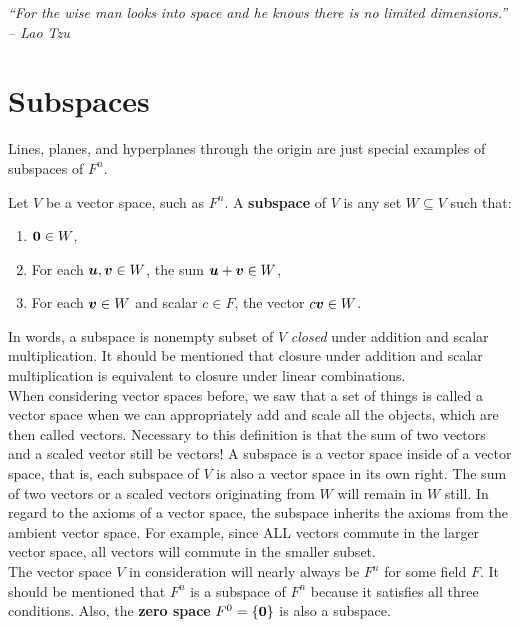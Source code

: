 \begin{center} 
\emph{``For the wise man looks into space and he knows there is no limited dimensions.'' -- Lao Tzu}
\end{center}

\section{Subspaces}\label{sec:subspace}
Lines, planes, and hyperplanes through the origin are just special examples of subspaces of $F^n$.\\

\begin{Def} Let $V$ be a vector space, such as $F^n$. A \textbf{subspace} of $V$ is any set $W \subseteq V$ such that:
\begin{enumerate}[!THM!, start=1]
\item $\boldsymbol 0 \in W$,
\item For each $\boldsymbol u, \boldsymbol v \in W$, the sum $\boldsymbol u + \boldsymbol v \in W$,
\item For each $\boldsymbol v \in W$ and scalar $c\in F$, the vector $c\boldsymbol v \in W$.
\end{enumerate}
\end{Def}\vs

In words, a subspace is nonempty subset of $V$ \emph{closed} under addition and scalar multiplication.  It should be mentioned that  closure under addition and scalar multiplication is equivalent to closure under linear combinations.\\

When considering vector spaces before, we saw that a set of things is called a vector space when we can appropriately add and scale all the objects, which are then called vectors. Necessary to this definition is that the sum of two vectors and a scaled vector still be vectors! A subspace is a vector space inside of a vector space, that is, each subspace of $V$ is also a vector space in its own right. The sum of two vectors or a scaled vectors originating from $W$ will remain in $W$ still. In regard to the axioms of a vector space, the subspace inherits the axioms from the ambient vector space. For example, since ALL vectors commute in the larger vector space, all vectors will commute in the smaller subset. \\

The vector space $V$ in consideration will nearly always be $F^n$ for some field $F$. It should be mentioned that $F^n$ is a subspace of $F^n$ because it satisfies all three conditions. Also, the \textbf{zero space} $F^0=\{\boldsymbol 0\}$ is also a subspace.\\


